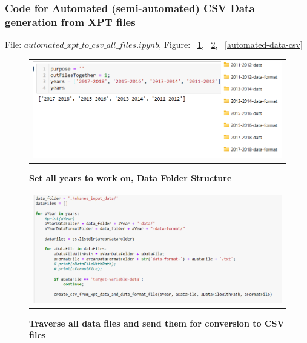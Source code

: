 \subsubsection{Code for Automated (semi-automated) CSV Data generation from XPT files}
\flushleft \justifying File: $automated\_xpt\_to\_csv\_all\_files.ipynb$, Figure: ~\ref{automated-data-year}, ~\ref{automated-data-traverse}, ~\ref{automated-data-csv}

\begin{figure}[!htb]
\begin{tabular}{c}
\includegraphics[scale=1]{images/datasetgenerationcode/set-years.png} \\
\end{tabular}
\caption{\textbf{Set all years to work on, Data Folder Structure}}
\label{automated-data-year}
\vspace{0.25cm}
\end{figure}

\begin{figure}[!htb]
\begin{tabular}{c}
\includegraphics[scale=0.8]{images/datasetgenerationcode/convert-all-input-datafiles-for-multiple-years-into-csv-files.png} \\
\end{tabular}
\caption{\textbf{Traverse all data files and send them for conversion to CSV files}}
\label{automated-data-traverse}
\vspace{0.25cm}
\end{figure}


